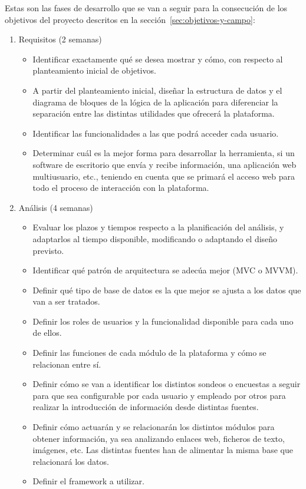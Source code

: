 Estas son las fases de desarrollo que se van a seguir para la
consecución de los objetivos del proyecto descritos en la sección~\ref{sec:objetivos-y-campo}:

\begin{enumerate}
  
\item Requisitos (2 semanas)
  \begin{itemize}
  \item Identificar exactamente qué se desea mostrar y cómo, con respecto al planteamiento inicial de objetivos.
  \item A partir del planteamiento inicial, diseñar la estructura de datos y el diagrama de bloques de la lógica de la aplicación para diferenciar la separación entre las distintas utilidades que ofrecerá la plataforma.
  \item Identificar las funcionalidades a las que podrá acceder cada usuario.
  \item Determinar cuál es la mejor forma para desarrollar la herramienta, si un software de escritorio que envía y recibe información, una aplicación web multiusuario, etc., teniendo en cuenta que se primará el acceso web para todo el proceso de interacción con la plataforma.
  \end{itemize}

\item Análisis (4 semanas)
  \begin{itemize}
  \item Evaluar los plazos y tiempos respecto a la planificación del análisis, y adaptarlos al tiempo disponible, modificando o adaptando el diseño previsto.
  \item Identificar qué patrón de arquitectura se adec\'ua mejor (MVC o MVVM).
  \item Definir qué tipo de base de datos es la que mejor se ajusta a los datos que van a ser tratados.
  \item Definir los roles de usuarios y la funcionalidad disponible para cada uno de ellos.
  \item Definir las funciones de cada módulo de la plataforma y cómo se relacionan entre sí.
  \item Definir cómo se van a identificar los distintos sondeos o encuestas a seguir para que sea configurable por cada usuario y empleado por otros para realizar la introducción de información desde distintas fuentes.
  \item Definir cómo actuarán y se relacionarán los distintos módulos para obtener información, ya sea analizando enlaces web, ficheros de texto, imágenes, etc. Las distintas fuentes han de alimentar la misma base que relacionará los datos.
  \item Definir el framework a utilizar.
  \end{itemize}



\end{enumerate}
